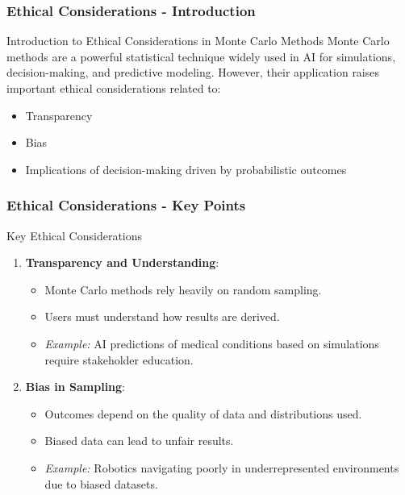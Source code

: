 \documentclass[aspectratio=169]{beamer}
\begin{document}
\begin{frame}[fragile]
    \frametitle{Ethical Considerations - Introduction}
    \begin{block}{Introduction to Ethical Considerations in Monte Carlo Methods}
        Monte Carlo methods are a powerful statistical technique widely used in AI for simulations, decision-making, and predictive modeling. However, their application raises important ethical considerations related to:
        \begin{itemize}
            \item Transparency
            \item Bias
            \item Implications of decision-making driven by probabilistic outcomes
        \end{itemize}
    \end{block}
\end{frame}

\begin{frame}[fragile]
    \frametitle{Ethical Considerations - Key Points}
    \begin{block}{Key Ethical Considerations}
        \begin{enumerate}
            \item \textbf{Transparency and Understanding}:
            \begin{itemize}
                \item Monte Carlo methods rely heavily on random sampling.
                \item Users must understand how results are derived.
                \item \textit{Example:} AI predictions of medical conditions based on simulations require stakeholder education.
            \end{itemize}

            \item \textbf{Bias in Sampling}:
            \begin{itemize}
                \item Outcomes depend on the quality of data and distributions used.
                \item Biased data can lead to unfair results.
                \item \textit{Example:} Robotics navigating poorly in underrepresented environments due to biased datasets.
            \end{itemize}
        \end{enumerate}
    \end{block}
\end{frame}
\end{document}

